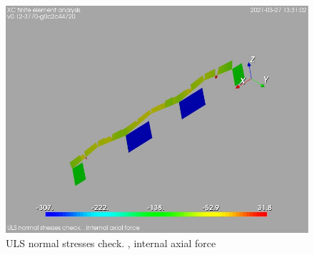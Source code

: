 \begin{figure}
\begin{center}
\includegraphics[width=\linewidth]{calc_results/sole_zeinali/text/graphics/normStrsULS/allMemberSetN}
\caption{ULS normal stresses check. , internal axial force}
\end{center}
\end{figure}
